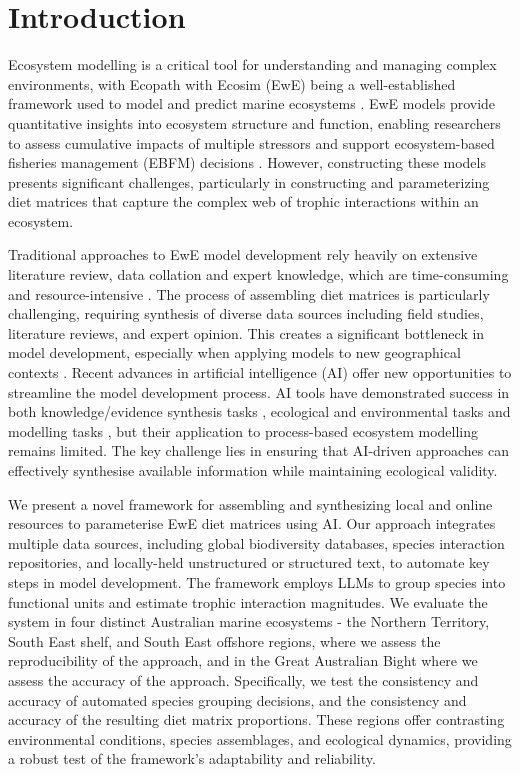\section{Introduction}

Ecosystem modelling is a critical tool for understanding and managing complex environments, with Ecopath with Ecosim (EwE) being a well-established framework used to model and predict marine ecosystems \citep{Christensen2004, Colleter2015}. EwE models provide quantitative insights into ecosystem structure and function, enabling researchers to assess cumulative impacts of multiple stressors and support ecosystem-based fisheries management (EBFM) decisions \citep{Coll2015, Villasante2016,Geary2020}. However, constructing these models presents significant challenges, particularly in constructing and parameterizing diet matrices that capture the complex web of trophic interactions within an ecosystem.

Traditional approaches to EwE model development rely heavily on extensive literature review, data collation and expert knowledge, which are time-consuming and resource-intensive \citep{Holden2024a}. The process of assembling diet matrices is particularly challenging, requiring synthesis of diverse data sources including field studies, literature reviews, and expert opinion. This creates a significant bottleneck in model development, especially when applying models to new geographical contexts \citep{Holden2024b,spilliasfuture}. Recent advances in artificial intelligence (AI) offer new opportunities to streamline the model development process. AI tools have demonstrated success in both knowledge/evidence synthesis tasks \citep{spillias2024human,keck2025extracting,spillias2024evaluating,Zheng2023}, ecological and environmental tasks \citep{Fernandes2024,Li2024,Chen2024} and modelling tasks \citep{Lapeyrolerie2022, Tuia2022, Karniadakis2021}, but their application to process-based ecosystem modelling remains limited. The key challenge lies in ensuring that AI-driven approaches can effectively synthesise available information while maintaining ecological validity.

We present a novel framework for assembling and synthesizing local and online resources to parameterise EwE diet matrices using AI. Our approach integrates multiple data sources, including global biodiversity databases, species interaction repositories, and locally-held unstructured or structured text, to automate key steps in model development. The framework employs LLMs to group species into functional units and estimate trophic interaction magnitudes. We evaluate the system in four distinct Australian marine ecosystems - the Northern Territory, South East shelf, and South East offshore regions, where we assess the reproducibility of the approach, and in the Great Australian Bight where we assess the accuracy of the approach. Specifically, we test the consistency and accuracy of automated species grouping decisions, and the consistency and accuracy of the resulting diet matrix proportions. These regions offer contrasting environmental conditions, species assemblages, and ecological dynamics, providing a robust test of the framework's adaptability and reliability.


